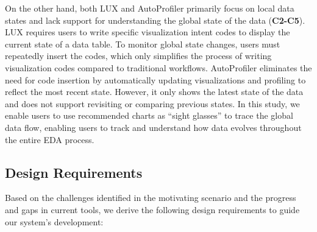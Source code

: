 On the other hand, both LUX and AutoProfiler primarily focus on local data states and lack support for understanding the global state of the data (\textbf{C2-C5}). 
LUX requires users to write specific visualization intent codes to display the current state of a data table. 
To monitor global state changes, users must repeatedly insert the codes, which only simplifies the process of writing visualization codes compared to traditional workflows. 
AutoProfiler eliminates the need for code insertion by automatically updating visualizations and profiling to reflect the most recent state. 
However, it only shows the latest state of the data and does not support revisiting or comparing previous states.
In this study, we enable users to use recommended charts as ``sight glasses'' to trace the global data flow, enabling users to track and understand how data evolves throughout the entire EDA process.

\subsection{Design Requirements}

Based on the challenges identified in the motivating scenario and the progress and gaps in current tools, we derive the following design requirements to guide our system's development:

